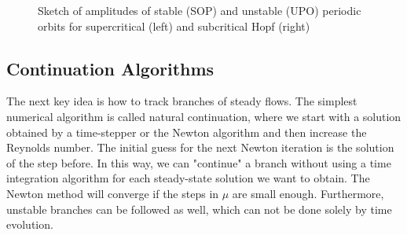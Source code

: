 \begin{figure}[ht]
\centering
\begin{subfigure}[t]{0.3\textwidth}
  \centering
\end{subfigure}
\hspace{0.1\textwidth}
\begin{subfigure}[t]{0.3\textwidth}
  \centering
\end{subfigure}
\caption{Sketch of amplitudes of stable (SOP) and unstable (UPO) periodic orbits
  for supercritical (left) and subcritical Hopf (right)}
\label{fig:hopf}
\end{figure}

\subsection{Continuation Algorithms} \label{sec:cont}

The next key idea is how to track branches of steady flows. The simplest
numerical algorithm is called natural continuation, where we start with a
solution obtained by a time-stepper or the Newton algorithm and then increase
the Reynolds number. The initial guess for the next Newton iteration is the
solution of the step before. In this way, we can "continue" a branch without
using a time integration algorithm for each steady-state solution we want to
obtain. The Newton method will converge if the steps in $\mu$ are small enough.
Furthermore, unstable branches can be followed as well, which can not be done
solely by time evolution.

